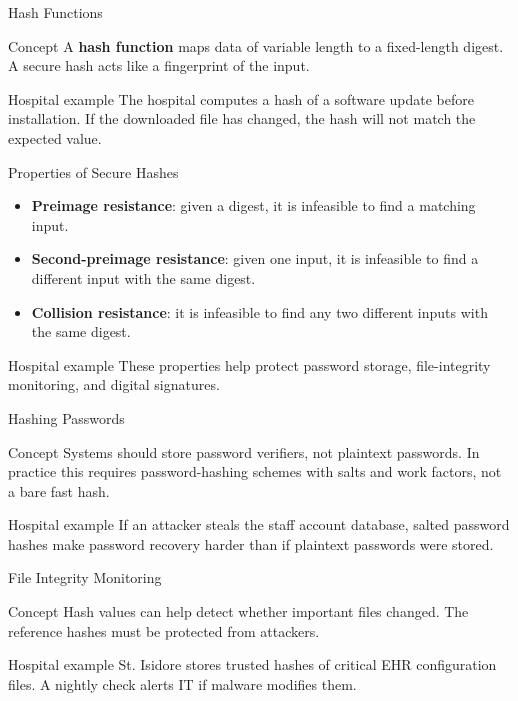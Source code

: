 \documentclass[presentation]{beamer}
\begin{document}
\begin{frame}[c]{Hash Functions}
\begin{block}{Concept}
A \textbf{hash function} maps data of variable length to a fixed-length digest. A secure hash acts
like a fingerprint of the input.
\end{block}

\begin{exampleblock}{Hospital example}
The hospital computes a hash of a software update before installation. If the downloaded file has
changed, the hash will not match the expected value.
\end{exampleblock}
\end{frame}

\begin{frame}[c]{Properties of Secure Hashes}
\begin{itemize}
    \item \textbf{Preimage resistance}: given a digest, it is infeasible to find a matching input.
    \item \textbf{Second-preimage resistance}: given one input, it is infeasible to find a different input with the same digest.
    \item \textbf{Collision resistance}: it is infeasible to find any two different inputs with the same digest.
\end{itemize}

\begin{exampleblock}{Hospital example}
These properties help protect password storage, file-integrity monitoring, and digital signatures.
\end{exampleblock}
\end{frame}

\begin{frame}[c]{Hashing Passwords}
\begin{block}{Concept}
Systems should store password verifiers, not plaintext passwords. In practice this requires
password-hashing schemes with salts and work factors, not a bare fast hash.
\end{block}

\begin{exampleblock}{Hospital example}
If an attacker steals the staff account database, salted password hashes make password recovery
harder than if plaintext passwords were stored.
\end{exampleblock}
\end{frame}

\begin{frame}[c]{File Integrity Monitoring}
\begin{block}{Concept}
Hash values can help detect whether important files changed. The reference hashes must be
protected from attackers.
\end{block}

\begin{exampleblock}{Hospital example}
St. Isidore stores trusted hashes of critical EHR configuration files. A nightly check alerts IT if
malware modifies them.
\end{exampleblock}
\end{frame}
\end{document}
